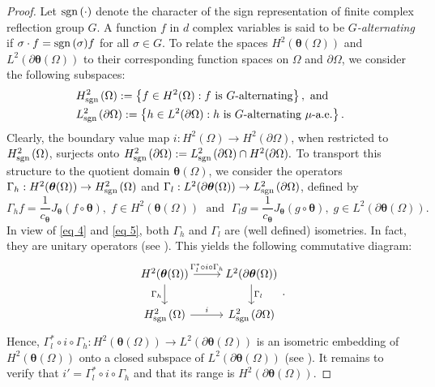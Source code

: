 \documentclass[12pt,reqno]{amsart}
\theoremstyle{remark}
\theoremstyle{definition}
\newcommand{\sgn}{{\rm sgn\,}}
\def \\theta{\boldsymbol{\theta}}
\def \\xi{\boldsymbol{\xi}}
\begin{document}
\begin{proof} Let $\sgn(\cdot)$ denote the character of the sign representation of finite complex reflection group $G.$ A function $f$ in $d$ complex variables is said to be {\it $G$-alternating} if $\sigma\cdot f=\sgn(\sigma) f$ for all $\sigma\in G.$
  To relate the spaces $H^2(\boldsymbol \theta(\Omega))$ and $L^2(\partial\boldsymbol \theta(\Omega))$ to their corresponding function spaces on $\Omega$ and $\partial\Omega$, we consider the following subspaces:
\begin{align*}
    & H_{\sgn}^2(\Omega):=\left\{f\in H^2(\Omega): f \text{ is } G\text{-alternating}\right\}, \text{ and}\\
& L^2_{\sgn}(\partial\Omega):=\left\{h\in L^2(\partial\Omega): h \text{ is } G\text{-alternating }\mu \text{-a.e.} \right\}.
\end{align*} 
Clearly, the boundary value map $i: H^2(\Omega) \to H^2(\partial\Omega)$, when restricted to $H^2_{\sgn}(\Omega)$, surjects onto $H^2_{\sgn}(\partial\Omega):= L^2_{\sgn}(\partial\Omega) \cap H^2(\partial\Omega).$ 
 To transport this structure to the quotient domain $\boldsymbol \theta(\Omega)$, we consider the operators $\Gamma_h:H^2(\boldsymbol \theta(\Omega)) \to H^2_{\sgn}(\Omega)$ and  $\Gamma_{l}: L^2(\partial\boldsymbol \theta(\Omega))\to L_{\sgn}^2(\partial\Omega)$, defined by $$\Gamma_h f=\frac{1}{c_{\boldsymbol \theta}} J_{\boldsymbol \theta} (f \circ \boldsymbol \theta), \; f\in H^2(\boldsymbol \theta(\Omega)) \; \text{ and }\;  \Gamma_{l} g=\frac{1}{c_{\boldsymbol \theta}} J_{\boldsymbol\theta} (g \circ \boldsymbol\theta),\; g\in L^2(\partial\boldsymbol \theta(\Omega)).$$  
In view of \eqref{eq 4} and \eqref{eq 5}, both $\Gamma_h$ and $\Gamma_l$ are (well defined) isometries. In fact, they are unitary operators (see \cite[Lemma 3.5, Lemma 3.14]{GR2024}). This yields the following commutative diagram:
$$\begin{tikzcd}
H^2(\boldsymbol \theta(\Omega))\arrow{r}{\Gamma_l^{*} \circ i \circ \Gamma_h } \arrow[swap]{d}{\Gamma_h} &  L^2(\partial \boldsymbol \theta(\Omega)) \arrow{d}{\Gamma_l} \\
 H^2_{\sgn}(\Omega) \arrow{r}{i} &L^2_{\sgn}(\partial\Omega)
\end{tikzcd}.$$
 Hence, $\Gamma_l^{*} \circ i \circ \Gamma_h: H^2(\boldsymbol{\theta}(\Omega))\to L^2(\partial\boldsymbol \theta(\Omega))$ is an isometric embedding of $H^2(\boldsymbol \theta(\Omega))$ onto a closed subspace of $L^2(\partial\boldsymbol \theta(\Omega))$ (see \cite[Lemma 3.15]{GR2024}). It remains to verify that $i'=\Gamma_l^{*} \circ i \circ \Gamma_h$ and that its range is $H^2(\partial\boldsymbol \theta(\Omega)).$  
 

\end{proof}
\end{document}

